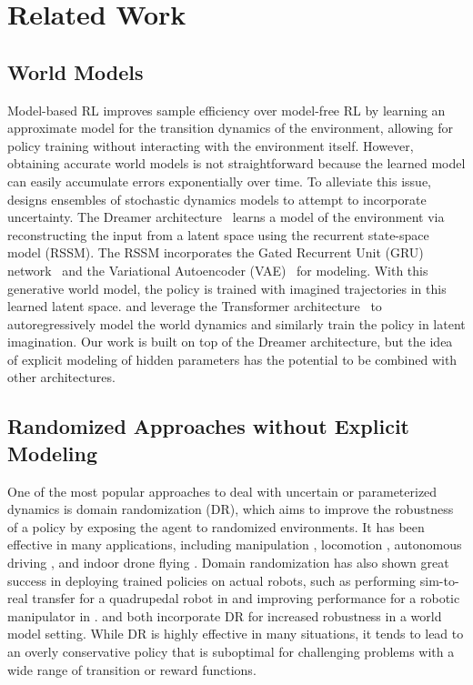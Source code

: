 \section{Related Work}
\subsection{World Models}

Model-based RL improves sample efficiency over model-free RL by learning an approximate model for the transition dynamics of the environment, allowing for policy training without interacting with the environment itself. However, obtaining accurate world models is not straightforward because the learned model can easily accumulate errors exponentially over time. To alleviate this issue, \cite{Chua2018} designs ensembles of stochastic dynamics models to attempt to incorporate uncertainty. The Dreamer architecture~\cite{Hafner2019,Hafner2020,Hafner2023} learns a model of the environment via reconstructing the input from a latent space using the recurrent state-space model (RSSM). The RSSM incorporates the Gated Recurrent Unit (GRU) network~\cite{Cho2014} and the Variational Autoencoder (VAE)~\cite{Kingma2013} for modeling. With this generative world model, the policy is trained with imagined trajectories in this learned latent space.  \cite{Robine2023} and \cite{Micheli2022} leverage the Transformer architecture~\cite{Vaswani2017} to autoregressively model the world dynamics and similarly train the policy in latent imagination. 
Our work is built on top of the Dreamer architecture, but the idea of explicit modeling of hidden parameters has the potential to be combined with other architectures.

\subsection{Randomized Approaches without Explicit Modeling}
One of the most popular approaches to deal with uncertain or parameterized dynamics is domain randomization (DR), which aims to improve the robustness of a policy by exposing the agent to randomized environments. It has been effective in many applications, including manipulation \cite{Peng2018, Tobin2017, Zhang2016, James2017}, locomotion \cite{Peng2020, Tan2018}, autonomous driving \cite{Tremblay2018}, and indoor drone flying \cite{Sadeghi2016}. 
Domain randomization has also shown great success in deploying trained policies on actual robots, such as performing sim-to-real transfer for a quadrupedal robot in \cite{Tan2018} and improving performance for a robotic manipulator in \cite{Peng2018}. \cite{rigter2024waker} and \cite{yamada2023twist} both incorporate DR for increased robustness in a world model setting. While DR is highly effective in many situations, it tends to lead to an overly conservative policy that is suboptimal for challenging problems with a wide range of transition or reward functions. 

